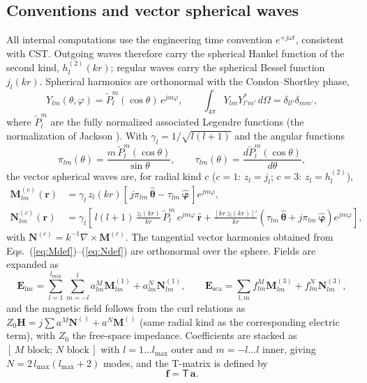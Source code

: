 \documentclass[11pt]{article}
\newcommand{\rr}{\mathbf{r}}
\newcommand{\EE}{\mathbf{E}}
\newcommand{\HH}{\mathbf{H}}
\newcommand{\Mv}[1]{\mathbf{M}^{(#1)}}
\newcommand{\Nv}[1]{\mathbf{N}^{(#1)}}
\newcommand{\rhat}{\hat{\mathbf{r}}}
\newcommand{\thhat}{\hat{\boldsymbol{\theta}}}
\newcommand{\phhat}{\hat{\boldsymbol{\varphi}}}
\newcommand{\Ptil}{\widetilde{P}}
\begin{document}
\subsection{Conventions and vector spherical waves}
\label{sec:conventions}
All internal computations use the engineering time convention
$e^{+j\omega t}$, consistent with CST.  Outgoing waves therefore carry
the spherical Hankel function of the second kind,
$h_l^{(2)}(kr)$; regular waves carry the spherical Bessel function
$j_l(kr)$.  Spherical harmonics are orthonormal with the
Condon--Shortley phase,
\begin{equation}
Y_{lm}(\theta,\varphi) = \Ptil_l^m(\cos\theta)\, e^{jm\varphi},
\qquad
\int_{4\pi} Y_{lm} Y_{l'm'}^* \, d\Omega = \delta_{ll'}\delta_{mm'},
\end{equation}
where $\Ptil_l^m$ are the fully normalized associated Legendre functions
(the normalization of Jackson \cite{Jackson1999}).  With
$\gamma_l = 1/\sqrt{l(l+1)}$ and the angular functions
\begin{equation}
\pi_{lm}(\theta) = \frac{m\,\Ptil_l^m(\cos\theta)}{\sin\theta},
\qquad
\tau_{lm}(\theta) = \frac{d \Ptil_l^m(\cos\theta)}{d\theta},
\label{eq:pitau}
\end{equation}
the vector spherical waves are, for radial kind $c$ ($c=1$: $z_l = j_l$;
$c=3$: $z_l = h_l^{(2)}$),
\begin{align}
\Mv{c}_{lm}(\rr) &= \gamma_l\, z_l(kr)
 \left[\, j\pi_{lm}\,\thhat - \tau_{lm}\,\phhat \,\right] e^{jm\varphi},
\label{eq:Mdef}\\
\Nv{c}_{lm}(\rr) &= \gamma_l \left[\, l(l+1)\,\frac{z_l(kr)}{kr}\,
 \Ptil_l^m\, e^{jm\varphi}\,\rhat
 + \frac{[kr\,z_l(kr)]'}{kr}
 \left(\tau_{lm}\,\thhat + j\pi_{lm}\,\phhat\right) e^{jm\varphi} \right],
\label{eq:Ndef}
\end{align}
with $\Nv{c} = k^{-1}\nabla\times\Mv{c}$.  The tangential vector
harmonics obtained from Eqs.~(\ref{eq:Mdef})--(\ref{eq:Ndef}) are
orthonormal over the sphere.  Fields are expanded as
\begin{equation}
\EE_{\mathrm{inc}} = \sum_{l=1}^{l_{\max}}\sum_{m=-l}^{l}
 a^M_{lm}\Mv{1}_{lm} + a^N_{lm}\Nv{1}_{lm},
\qquad
\EE_{\mathrm{sca}} = \sum_{l,m}
 f^M_{lm}\Mv{3}_{lm} + f^N_{lm}\Nv{3}_{lm},
\label{eq:expansions}
\end{equation}
and the magnetic field follows from the curl relations as
$Z_0\HH = j\sum a^M \Nv{} + a^N \Mv{}$ (same radial kind as the
corresponding electric term), with $Z_0$ the free-space impedance.
Coefficients are stacked as $[\,M\text{ block};\,N\text{ block}\,]$ with
$l = 1\ldots l_{\max}$ outer and $m = -l \ldots l$ inner, giving
$N = 2\,l_{\max}(l_{\max}+2)$ modes, and the T-matrix is defined by
\begin{equation}
\mathbf{f} = \mathsf{T}\,\mathbf{a}.
\label{eq:Tdef}
\end{equation}
\end{document}
